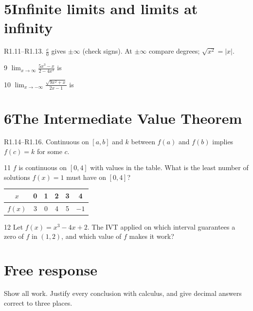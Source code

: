 \documentclass{apcalc}
\begin{document}
\section*{5\quad Infinite limits and limits at infinity}
\begin{setrule}R1.11–R1.13. $\frac{c}{0}$ gives $\pm\infty$ (check signs). At $\pm\infty$ compare degrees; $\sqrt{x^2}=|x|$.\end{setrule}
\begin{q}{9}
$\displaystyle\lim_{x\to\infty}\frac{5x^3-x}{2-4x^3}$ is
\end{q}
\begin{q}{10}
$\displaystyle\lim_{x\to-\infty}\frac{\sqrt{9x^2+x}}{2x-1}$ is
\end{q}
\section*{6\quad The Intermediate Value Theorem}
\begin{setrule}R1.14–R1.16. Continuous on $[a,b]$ and $k$ between $f(a)$ and $f(b)$ implies $f(c)=k$ for some $c$.\end{setrule}
\begin{q}{11}
$f$ is continuous on $[0,4]$ with values in the table. What is the least number of solutions $f(x)=1$ must have on $[0,4]$?\calcmark
\begin{center}\small\renewcommand{\arraystretch}{1.35}\begin{tabular}{|c|c|c|c|c|c|}
\hline
$x$ & 0 & 1 & 2 & 3 & 4 \\ \hline
$f(x)$ & 3 & 0 & 4 & 5 & $-1$ \\ \hline
\end{tabular}\end{center}
\end{q}
\begin{q}{12}
Let $f(x)=x^3-4x+2$. The IVT applied on which interval guarantees a zero of $f$ in $(1,2)$, and which value of $f$ makes it work?\calcmark
{}
\end{q}
\clearpage\section*{Free response}
Show all work. Justify every conclusion with calculus, and give decimal answers correct to three places.
\end{document}
